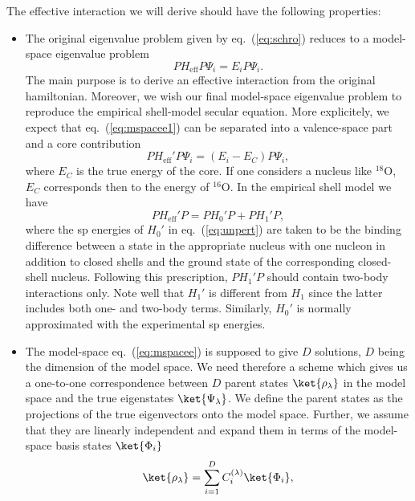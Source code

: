 The effective interaction we will derive should have the following
properties:
\begin{itemize}
\item The original eigenvalue problem given by eq.\ (\ref{eq:schro})
 reduces to a model-space eigenvalue problem
\begin{equation}
    PH_{\mathrm{eff}}P\Psi_i = E_i P\Psi_i.
    \label{eq:mspacee1}
\end{equation}
 The main purpose is to derive an effective interaction from the 
  original hamiltonian. Moreover, we wish our final model-space
  eigenvalue problem to reproduce the empirical shell-model
  secular equation. More explicitely, we expect that eq.\ (\ref{eq:mspacee1})
  can be separated into a valence-space part and a core contribution
\begin{equation}
    PH_{\mathrm{eff}}'P\Psi_i = \left( E_i -E_C\right) P\Psi_i,
    \label{eq:mspacee}
\end{equation}
  where $E_C$ is the true energy of the core. If one considers a nucleus
 like $^{18}$O, $E_C$ corresponds then to the energy of $^{16}$O.
 In the empirical shell model we have
\begin{equation}
  PH_{\mathrm{eff}}'P = PH_0'P + PH_1'P,
\end{equation}
 where the sp energies of $H_0'$ in eq.\ (\ref{eq:unpert}) are taken
 to be the binding difference between a state in the appropriate nucleus
 with one nucleon in addition to closed shells and the ground state of
the corresponding closed-shell nucleus. Following this prescription,
 $PH_1'P$ should contain two-body interactions only. Note well that 
 $H_1'$ is different from $H_1$ since the latter includes both one-
and two-body terms. Similarly, $H_0'$ is normally approximated with the
experimental sp energies.
\item
  The model-space eq.\ (\ref{eq:mspacee}) is supposed to give
  $D$ solutions, $D$ being the dimension of the model space. We need therefore
  a scheme which gives us a one-to-one correspondence between $D$ parent
states $\ket{\rho_{\lambda}}$ in the model space and the true eigenstates 
$\ket{\Psi_{\lambda}}$. 
We define the parent states as the projections of the true eigenvectors
onto the model space. Further, we assume that they are linearly independent
and expand them in terms of the model-space basis states $\ket{\Phi_i}$
\begin{equation}
\ket{\rho_{\lambda}}=\sum_{i=1}^{D}C_i^{(\lambda)}\ket{\Phi_i},
\label{eq:parent}
\end{equation}

\end{itemize}
